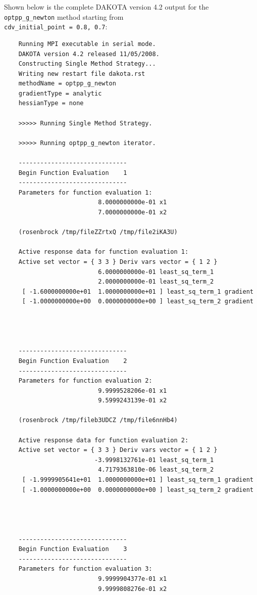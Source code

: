 Shown below is the complete DAKOTA version 4.2 output for the
\texttt{optpp\_g\_newton} method starting from\\
\texttt{cdv\_initial\_point = 0.8, 0.7}:
\begin{small}
\begin{verbatim}
    Running MPI executable in serial mode.
    DAKOTA version 4.2 released 11/05/2008.
    Constructing Single Method Strategy...
    Writing new restart file dakota.rst
    methodName = optpp_g_newton
    gradientType = analytic
    hessianType = none
    
    >>>>> Running Single Method Strategy.
    
    >>>>> Running optpp_g_newton iterator.
    
    ------------------------------
    Begin Function Evaluation    1
    ------------------------------
    Parameters for function evaluation 1:
                          8.0000000000e-01 x1
                          7.0000000000e-01 x2
    
    (rosenbrock /tmp/fileZZrtxQ /tmp/file2iKA3U)
    
    Active response data for function evaluation 1:
    Active set vector = { 3 3 } Deriv vars vector = { 1 2 }
                          6.0000000000e-01 least_sq_term_1
                          2.0000000000e-01 least_sq_term_2
     [ -1.6000000000e+01  1.0000000000e+01 ] least_sq_term_1 gradient
     [ -1.0000000000e+00  0.0000000000e+00 ] least_sq_term_2 gradient
    
    
    
    
    ------------------------------
    Begin Function Evaluation    2
    ------------------------------
    Parameters for function evaluation 2:
                          9.9999528206e-01 x1
                          9.5999243139e-01 x2
    
    (rosenbrock /tmp/fileb3UDCZ /tmp/file6nnHb4)
    
    Active response data for function evaluation 2:
    Active set vector = { 3 3 } Deriv vars vector = { 1 2 }
                         -3.9998132761e-01 least_sq_term_1
                          4.7179363810e-06 least_sq_term_2
     [ -1.9999905641e+01  1.0000000000e+01 ] least_sq_term_1 gradient
     [ -1.0000000000e+00  0.0000000000e+00 ] least_sq_term_2 gradient
    
    
    
    
    ------------------------------
    Begin Function Evaluation    3
    ------------------------------
    Parameters for function evaluation 3:
                          9.9999904377e-01 x1
                          9.9999808276e-01 x2
    

\end{verbatim}
\end{small}
